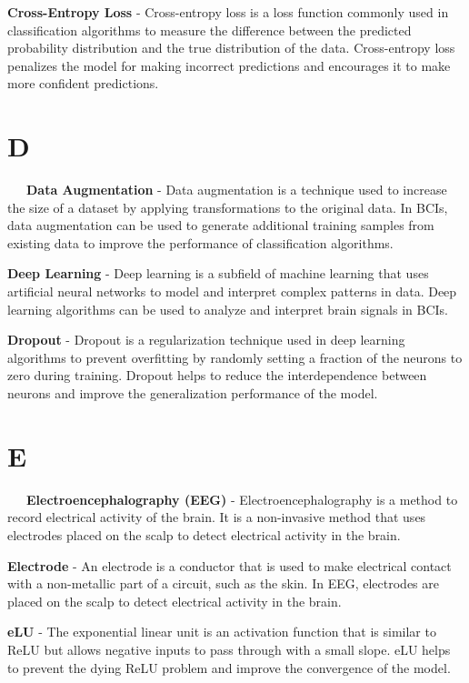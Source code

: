 \textbf{Cross-Entropy Loss} - Cross-entropy loss is a loss function commonly used in classification algorithms to measure the difference between the predicted probability distribution and the true distribution of the data. Cross-entropy loss penalizes the model for making incorrect predictions and encourages it to make more confident predictions.

\section*{D}

\-\ \-\ \-\ \textbf{Data Augmentation} - Data augmentation is a technique used to increase the size of a dataset by applying transformations to the original data. In BCIs, data augmentation can be used to generate additional training samples from existing data to improve the performance of classification algorithms.

\textbf{Deep Learning} - Deep learning is a subfield of machine learning that uses artificial neural networks to model and interpret complex patterns in data. Deep learning algorithms can be used to analyze and interpret brain signals in BCIs.

\textbf{Dropout} - Dropout is a regularization technique used in deep learning algorithms to prevent overfitting by randomly setting a fraction of the neurons to zero during training. Dropout helps to reduce the interdependence between neurons and improve the generalization performance of the model.

\section*{E}

\-\ \-\ \-\ \textbf{Electroencephalography (EEG)} - Electroencephalography is a method to record electrical activity of the brain. It is a non-invasive method that uses electrodes placed on the scalp to detect electrical activity in the brain.

\textbf{Electrode} - An electrode is a conductor that is used to make electrical contact with a non-metallic part of a circuit, such as the skin. In EEG, electrodes are placed on the scalp to detect electrical activity in the brain.

\textbf{eLU} - The exponential linear unit is an activation function that is similar to ReLU but allows negative inputs to pass through with a small slope. eLU helps to prevent the dying ReLU problem and improve the convergence of the model.

